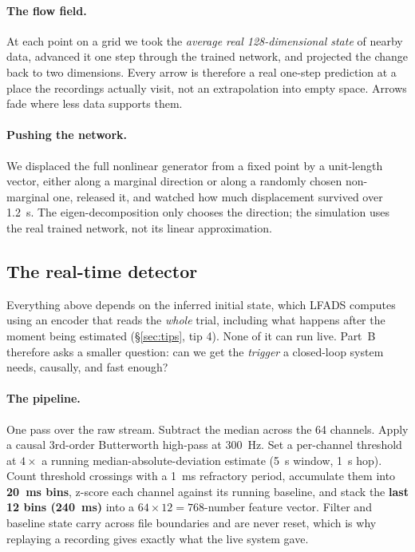 \documentclass[11pt]{article}
\begin{document}
\paragraph{The flow field.} At each point on a grid we took the \emph{average
real 128-dimensional state} of nearby data, advanced it one step through the
trained network, and projected the change back to two dimensions. Every arrow is
therefore a real one-step prediction at a place the recordings actually visit,
not an extrapolation into empty space. Arrows fade where less data supports them.

\paragraph{Pushing the network.} We displaced the full nonlinear generator from a
fixed point by a unit-length vector, either along a marginal direction or along a
randomly chosen non-marginal one, released it, and watched how much displacement
survived over 1.2~s. The eigen-decomposition only chooses the direction; the
simulation uses the real trained network, not its linear approximation.

\subsection{The real-time detector}

Everything above depends on the inferred initial state, which LFADS computes
using an encoder that reads the \emph{whole} trial, including what happens after
the moment being estimated (\S\ref{sec:tips}, tip 4). None of it can run live.
Part~B therefore asks a smaller question: can we get the \emph{trigger} a
closed-loop system needs, causally, and fast enough?

\paragraph{The pipeline.} One pass over the raw stream. Subtract the median
across the 64 channels. Apply a causal 3rd-order Butterworth high-pass at 300~Hz.
Set a per-channel threshold at $4\times$ a running median-absolute-deviation
estimate (5~s window, 1~s hop). Count threshold crossings with a 1~ms refractory
period, accumulate them into \textbf{20~ms bins}, z-score each channel against
its running baseline, and stack the \textbf{last 12 bins (240~ms)} into a
$64 \times 12 = 768$-number feature vector. Filter and baseline state carry
across file boundaries and are never reset, which is why replaying a recording
gives exactly what the live system gave.
\end{document}
